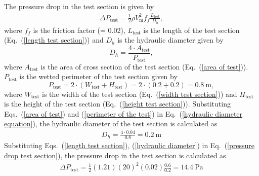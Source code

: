 The pressure drop in the test section is given by
\begin{align}\label{pressure drop test section}
    \Delta P_{\text{test}} = \frac{1}{2} \rho V_{\text{m}}^2 f_f \frac{L_{\text{test}}}{D_h},
\end{align}
where $f_f$ is the friction factor (= 0.02), $L_{\text{test}}$ is the length of the test section (Eq.~(\ref{length test section})) and $D_h$ is the hydraulic diameter given by
\begin{equation}\label{hydraulic diameter equation}
    D_h = \frac{4 \cdot A_{\text{test}}}{P_{\text{test}}},
\end{equation}
where $A_{\text{test}}$ is the area of cross section of the test section (Eq.~(\ref{area of test})). $P_{\text{test}}$ is the wetted perimeter of the test section given by
\begin{equation}\label{perimeter of the test}
    P_{\text{test}} = 2 \cdot (W_{\text{test}} + H_{\text{test}}) = 2 \cdot (0.2 + 0.2) = 0.8~\text{m},
\end{equation}
where $W_{\text{test}}$ is the width of the test section (Eq.~(\ref{width test section})) and $H_{\text{test}}$ is the height of the test section (Eq.~(\ref{height test section})).
Substituting Eqs.~(\ref{area of test}) and (\ref{perimeter of the test}) in Eq.~(\ref{hydraulic diameter equation}), the hydraulic diameter of the test section is calculated as
\begin{align}\label{hydraulic diameter}
    D_h = \frac{4 \cdot 0.04}{0.8} = 0.2~\text{m}
\end{align} 
Substituting Eqs.~(\ref{length test section}), (\ref{hydraulic diameter}) in Eq.~(\ref{pressure drop test section}), the pressure drop in the test section is calculated as
\begin{align}\label{pressure drop test section value}
    \Delta P_{\text{test}} = \frac{1}{2} (1.21) (20)^2 (0.02) \frac{0.6}{0.2} = 14.4~\text{Pa}
\end{align}


